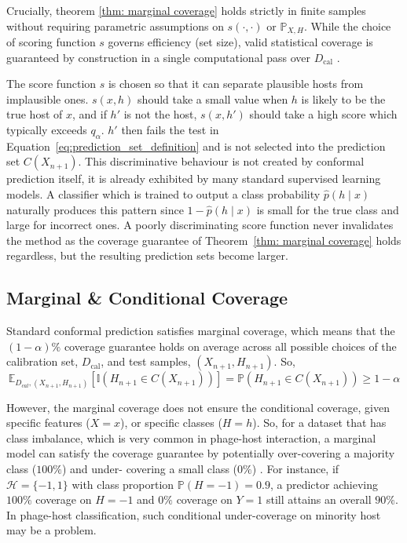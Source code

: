 Crucially, theorem \ref{thm: marginal coverage} holds strictly in finite samples without requiring parametric 
assumptions on $s(\cdot, \cdot)$ or $\mathbb{P}_{X,H}$. While the choice of scoring function $s$ governs efficiency (set 
size), valid statistical coverage is guaranteed by construction in a single computational pass over $D_{\text{cal}}$ 
\cite{ochoarivera2024conformal}.

The score function $s$ is chosen so that it can separate plausible hosts from implausible ones. $s(x,h)$ should take a 
small value when $h$ is likely to be the true host of $x$, and if $h'$ is not the host, $s(x, h')$ should take a high
score which typically exceeds $q_{\alpha}$. $h'$ then fails the test in Equation~\ref{eq:prediction_set_definition} 
and is not selected into the prediction set $C(X_{n+1})$. This discriminative behaviour is not created by conformal 
prediction itself, it is already exhibited by many standard supervised learning models. A classifier which is trained to
output a class probability $\hat p(h \mid x)$ naturally produces this pattern since $1-\hat p(h\mid x)$ is
small for the true class and large for incorrect ones. A poorly discriminating score function never invalidates the 
method as the coverage guarantee of Theorem~\ref{thm: marginal coverage} holds regardless, but the resulting prediction 
sets become larger. 


\subsection{Marginal \& Conditional Coverage}
\label{sec2.3.3: coverage types}
Standard conformal prediction satisfies marginal coverage, which means that the $(1-\alpha)\%$ coverage guarantee 
holds on average across all possible choices of the calibration set, $D_{\text{cal}}$, and test samples, $(X_{n+1}, 
H_{n+1})$. So, 
$$\mathbb{E}_{D_{cal}, (X_{n+1}, H_{n+1})} \left[ \mathbb{I}(H_{n+1} \in C(X_{n+1})) \right] = \mathbb{P}(H_{n+1} \in 
C(X_{n+1})) \geq 1 - \alpha$$

\newpage
However, the marginal coverage does not ensure the conditional coverage, given specific features ($X = x$), or 
specific classes ($H=h$). So, for a dataset that has class imbalance, which is very common in phage-host interaction, a 
marginal model can satisfy the coverage guarantee by potentially over-covering a majority class ($100\%$) and under-
covering a small class ($0\%$) \cite{ochoarivera2024conformal, romano2020classification}. For instance, if $\mathcal{H} 
= \{-1, 1\}$ with class proportion $\mathbb{P}(H = -1) = 0.9$, a predictor achieving $100\%$ coverage on $H = -1$ and 
$0\%$ coverage on $Y = 1$ still attains an overall $90\%$. In phage-host classification, such conditional under-coverage 
on minority host may be a problem. 
 
